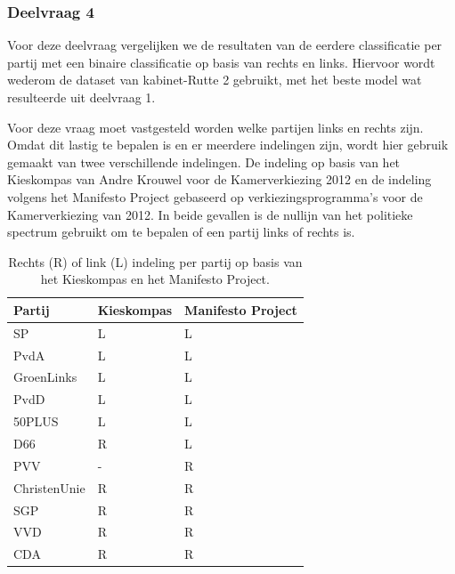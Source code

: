 \subsubsection{Deelvraag 4}
Voor deze deelvraag vergelijken we de resultaten van de eerdere classificatie per partij met een binaire classificatie op basis van rechts en links. Hiervoor wordt wederom de dataset van kabinet-Rutte 2 gebruikt, met het beste model wat resulteerde uit deelvraag 1. \par
Voor deze vraag moet vastgesteld worden welke partijen links en rechts zijn. Omdat dit lastig te bepalen is en er meerdere indelingen zijn, wordt hier gebruik gemaakt van twee verschillende indelingen. De indeling op basis van het Kieskompas van Andre Krouwel voor de Kamerverkiezing 2012 en de indeling volgens het Manifesto Project\cite{Volkens:2017} gebaseerd op verkiezingsprogramma's voor de Kamerverkiezing van 2012. In beide gevallen is de nullijn van het politieke spectrum gebruikt om te bepalen of een partij links of rechts is.\par

\begin{table}[H]
\centering
\caption{Rechts (R) of link (L) indeling per partij op basis van het Kieskompas en het Manifesto Project.}
\label{my-label}
\centering
\begin{tabular}{lll}
\hline
Partij  & Kieskompas & Manifesto Project \\ \hline
SP           & L & L\\ 
PvdA         & L & L\\ 
GroenLinks   & L & L\\ 
PvdD         & L & L\\ 
50PLUS       & L & L\\ 
D66          & R & L\\ 
PVV          & - & R\\ 
ChristenUnie & R & R\\ 
SGP          & R & R\\ 
VVD          & R & R\\ 
CDA          & R & R\\
\end{tabular}
\end{table}


